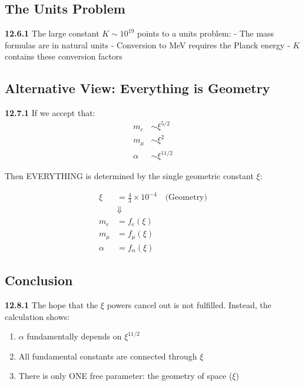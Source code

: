 \documentclass[12pt,a4paper]{article}
\begin{document}
\subsection{The Units Problem}

\noindent \textbf{12.6.1} The large constant $K \sim 10^{19}$ points to a units problem:
- The mass formulas are in natural units
- Conversion to MeV requires the Planck energy
- $K$ contains these conversion factors

\subsection{Alternative View: Everything is Geometry}

\noindent \textbf{12.7.1} If we accept that:
\begin{align}
	m_e &\sim \xi^{5/2} \\
	m_\mu &\sim \xi^2 \\
	\alpha &\sim \xi^{11/2}
\end{align}

Then EVERYTHING is determined by the single geometric constant $\xi$:

\begin{equation}
	\boxed{
		\begin{aligned}
			\xi &= \frac{4}{3} \times 10^{-4} \quad \text{(Geometry)} \\
			&\Downarrow \\
			m_e &= f_e(\xi) \\
			m_\mu &= f_\mu(\xi) \\
			\alpha &= f_\alpha(\xi)
		\end{aligned}
	}
\end{equation}

\subsection{Conclusion}

\noindent \textbf{12.8.1} The hope that the $\xi$ powers cancel out is not fulfilled. Instead, the calculation shows:

\begin{enumerate}
	\item $\alpha$ fundamentally depends on $\xi^{11/2}$
	\item All fundamental constants are connected through $\xi$
	\item There is only ONE free parameter: the geometry of space ($\xi$)
\end{enumerate}
\end{document}
